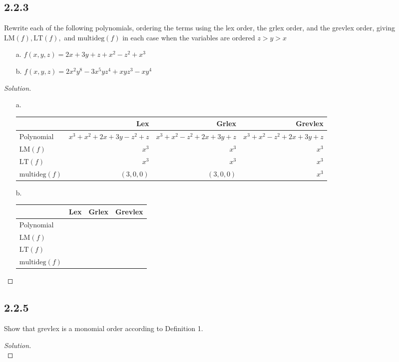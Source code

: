 \documentclass[]{article}
\newcommand\<{\langle}
\renewcommand\>{\rangle}
\newenvironment{solution}
{
	\begin{proof}[Solution] \text{ }
		\\
	}
	{
	\end{proof}
}
\begin{document}
\subsection*{2.2.3} Rewrite each of the following polynomials, ordering the terms using the lex order, the grlex order, and the grevlex order, giving $\text{LM}(f), \text{LT}(f),$ and $\text{multideg}(f)$ in each case when the variables are ordered $z > y > x$
\begin{enumerate}
	\item[a.] $f(x, y, z) = 2x + 3y + z + x^2 -z^2 + x^3$
	\item[b.] $f(x, y, z) = 2x^2y^8 - 3x^5yz^4 + xyz^3 - xy^4$
\end{enumerate}
\begin{solution}
\begin{enumerate}
	\item[a.] \text{ } \\
	\begin{tabular}{l|r|r|r}
		 & Lex & Grlex & Grevlex \\
		\hline
		Polynomial & $x^3 + x^2 + 2x + 3y - z^2 + z$ & $x^3 + x^2- z^2 + 2x + 3y + z$ & $x^3 + x^2 - z^2 + 2x + 3y  + z$\\
		$\text{LM}(f)$ & $x^3$ & $x^3$ & $x^3$\\
		$\text{LT}(f)$ & $x^3$ & $x^3$ & $x^3$\\
		$\text{multideg}(f)$ & $(3,0,0)$ & $(3,0,0)$ & $x^3$
	\end{tabular}
	\item[b.] \text{ } \\
	\begin{tabular}{l|r|r|r}
		& Lex & Grlex & Grevlex \\
		\hline
		Polynomial & & & \\
		$\text{LM}(f)$ & & & \\
		$\text{LT}(f)$ & & & \\
		$\text{multideg}(f)$ & & &
	\end{tabular}
\end{enumerate}
\end{solution}

\subsection*{2.2.5} Show that grevlex is a monomial order according to Definition 1.
\begin{solution}
	
\end{solution}
\end{document}
